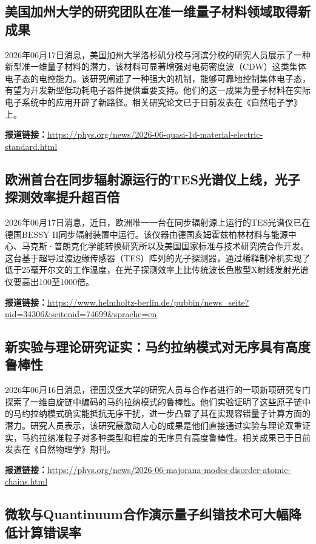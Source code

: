 \documentclass[12pt,a4paper]{ctexart}
\begin{document}
\subsection{ 美国加州大学的研究团队在准一维量子材料领域取得新成果 }

2026年06月17日消息，美国加州大学洛杉矶分校与河滨分校的研究人员展示了一种新型准一维量子材料的潜力，该材料可显著增强对电荷密度波（CDW）这类集体电子态的电控能力。该研究阐述了一种强大的机制，能够可靠地控制集体电子态，有望为开发新型低功耗电子器件提供重要支持。他们的这一成果为量子材料在实际电子系统中的应用开辟了新路径。相关研究论文已于日前发表在《自然电子学》上。

\noindent\textbf{报道链接：}\url{https://phys.org/news/2026-06-quasi-1d-material-electric-standard.html}

\subsection{ 欧洲首台在同步辐射源运行的TES光谱仪上线，光子探测效率提升超百倍 }

2026年06月17日消息，近日，欧洲唯一一台在同步辐射源上运行的TES光谱仪已在德国BESSY II同步辐射装置中运行。该仪器由德国亥姆霍兹柏林材料与能源中心、马克斯·普朗克化学能转换研究所以及美国国家标准与技术研究院合作开发。这台基于超导过渡边缘传感器（TES）阵列的光子探测器，通过稀释制冷机实现了低于25毫开尔文的工作温度，在光子探测效率上比传统波长色散型X射线发射光谱仪要高出100至1000倍。

\noindent\textbf{报道链接：}\url{https://www.helmholtz-berlin.de/pubbin/news\_seite?nid=34306\&seitenid=74699\&sprache=en}

\subsection{ 新实验与理论研究证实：马约拉纳模式对无序具有高度鲁棒性 }

2026年06月16日消息，德国汉堡大学的研究人员与合作者进行的一项新项研究专门探索了一维自旋链中编码的马约拉纳模式的鲁棒性。他们实验证明了这些原子链中的马约拉纳模式确实能抵抗无序干扰，进一步凸显了其在实现容错量子计算方面的潜力。研究人员表示，该研究最激动人心的成果是他们直接通过实验与理论双重证实，马约拉纳准粒子对多种类型和程度的无序具有高度鲁棒性。相关成果已于日前发表在《自然物理学》期刊。

\noindent\textbf{报道链接：}\url{https://phys.org/news/2026-06-majorana-modes-disorder-atomic-chains.html}

\subsection{ 微软与Quantinuum合作演示量子纠错技术可大幅降低计算错误率 }
\end{document}
